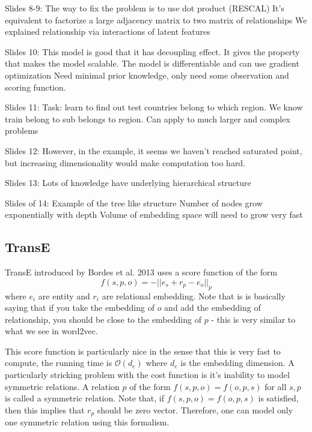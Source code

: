 \documentclass{article}
\begin{document}
Slides 8-9:
The way to fix the problem is to use dot product (RESCAL)
It’s equivalent to factorize a large adjacency matrix to two matrix of relationships
We explained relationship via interactions of latent features

Slides 10:
This model is good that it has decoupling effect. It gives the property that makes the model scalable.
The model is differentiable and can use gradient optimization 
Need minimal prior knowledge, only need some observation and scoring function.

Slides 11:
Task: learn to find out test countries belong to which region.
We know train belong to sub belongs to region.
Can apply to much larger and complex problems

Slides 12:
However, in the example, it seems we haven’t reached saturated point, but increasing dimensionality would make computation too hard.

Slides 13:
Lots of knowledge have underlying hierarchical structure 

Slides of 14:
Example of the tree like structure
Number of nodes grow exponentially with depth
Volume of embedding space will need to grow very fast



\subsection{TransE}
TransE introduced by Bordes et al. 2013 uses a score function of the form $$ f(s, p, o) = -|| e_s + r_p - e_o ||_p $$ where $e_i$ are entity and $r_i$ are relational embedding. Note that is is basically saying that if you take the embedding of $o$ and add the embedding of relationship, you should be close to the embedding of $p$ - this is very similar to what we see in word2vec. 

This score function is particularly nice in the sense that this is very fast to compute, the running time is $\mathcal{O}(d_e)$ where $d_e$ is the embedding dimension. A particularly stricking problem with the cost function is it's inability to model symmetric relations. A relation $p$ of the form $f(s, p, o) = f(o, p, s)$ for all $s, p$ is called a symmetric relation. Note that, if $f(s, p, o) = f(o, p, s)$ is satisfied, then this implies that $r_p$ should be zero vector. Therefore, one can model only one symmetric relation using this formalism. 
\end{document}
